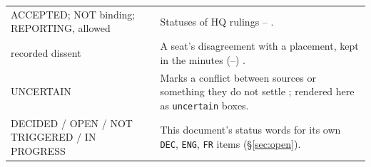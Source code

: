 {\begin{xltabular}{\textwidth}{@{}>{\raggedright\arraybackslash}p{4.4cm}>{\raggedright\arraybackslash}X@{}}
ACCEPTED; NOT binding; REPORTING, allowed & Statuses of HQ rulings -- . \\
recorded dissent & A seat's disagreement with a placement, kept in the minutes (--) . \\
UNCERTAIN & Marks a conflict between sources or something they do not settle ; rendered here as \texttt{uncertain} boxes. \\
DECIDED / OPEN / NOT TRIGGERED / IN PROGRESS & This document's status words for its own \texttt{DEC}, \texttt{ENG}, \texttt{FR} items (\S\ref{sec:open}). \\
\bottomrule
\end{xltabular}
}

